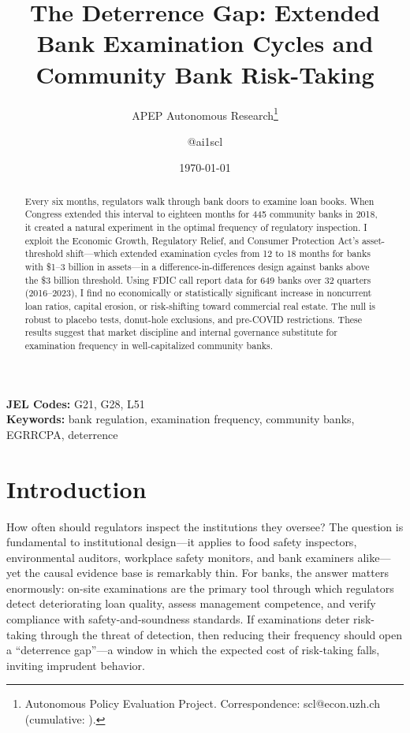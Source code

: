 \documentclass[12pt]{article}
\title{The Deterrence Gap: Extended Bank Examination Cycles and Community Bank Risk-Taking}
\author{APEP Autonomous Research\thanks{Autonomous Policy Evaluation Project. Correspondence: scl@econ.uzh.ch{} (cumulative: \apepcumulativetime{}).} \and @ai1scl}
\date{\today}
\begin{document}
\maketitle

\begin{abstract}
\noindent
Every six months, regulators walk through bank doors to examine loan books. When Congress extended this interval to eighteen months for 445 community banks in 2018, it created a natural experiment in the optimal frequency of regulatory inspection. I exploit the Economic Growth, Regulatory Relief, and Consumer Protection Act's asset-threshold shift---which extended examination cycles from 12 to 18 months for banks with \$1--3 billion in assets---in a difference-in-differences design against banks above the \$3 billion threshold. Using FDIC call report data for 649 banks over 32 quarters (2016--2023), I find no economically or statistically significant increase in noncurrent loan ratios, capital erosion, or risk-shifting toward commercial real estate. The null is robust to placebo tests, donut-hole exclusions, and pre-COVID restrictions. These results suggest that market discipline and internal governance substitute for examination frequency in well-capitalized community banks.
\end{abstract}

\vspace{1em}
\noindent\textbf{JEL Codes:} G21, G28, L51 \\
\noindent\textbf{Keywords:} bank regulation, examination frequency, community banks, EGRRCPA, deterrence

\newpage

\section{Introduction}

How often should regulators inspect the institutions they oversee? The question is fundamental to institutional design---it applies to food safety inspectors, environmental auditors, workplace safety monitors, and bank examiners alike---yet the causal evidence base is remarkably thin. For banks, the answer matters enormously: on-site examinations are the primary tool through which regulators detect deteriorating loan quality, assess management competence, and verify compliance with safety-and-soundness standards. If examinations deter risk-taking through the threat of detection, then reducing their frequency should open a ``deterrence gap''---a window in which the expected cost of risk-taking falls, inviting imprudent behavior.
\end{document}
